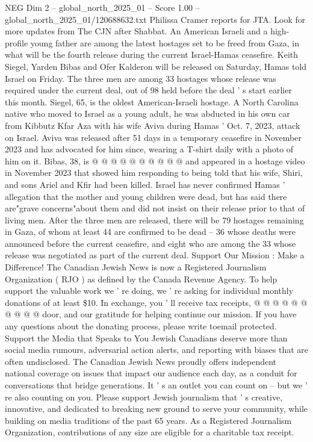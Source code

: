 \begin{textsample}{NEG Dim 2 – global\_north\_2025\_01 – Score 1.00 – global\_north\_2025\_01/120688632.txt}  \label{ex:f2_neg_084}
Philissa Cramer reports for JTA.
Look for more updates from The CJN after Shabbat.
An American Israeli and a high-profile young father are among the latest hostages set to be freed from Gaza, in what will be the fourth release during the current Israel-Hamas ceasefire.
Keith Siegel, Yarden Bibas and Ofer Kalderon will be released on Saturday, Hamas told Israel on Friday.
The three men are among 33 hostages whose release was required under the current deal, out of 98 held before the deal ' s start earlier this month.
Siegel, 65, is the oldest American-Israeli hostage.
A North Carolina native who moved to Israel as a young adult, he was abducted in his own car from Kibbutz Kfar Aza with his wife Aviva during Hamas ' Oct. 7, 2023, attack on Israel.
Aviva was released after 51 days in a temporary ceasefire in November 2023 and has advocated for him since, wearing a T-shirt daily with a photo of him on it.
Bibas, 38, is @ @ @ @ @ @ @ @ @ @ and appeared in a hostage video in November 2023 that showed him responding to being told that his wife, Shiri, and sons Ariel and Kfir had been killed.
Israel has never confirmed Hamas ' allegation that the mother and young children were dead, but has said there are"grave concerns"about them and did not insist on their release prior to that of living men.
After the three men are released, there will be 79 hostages remaining in Gaza, of whom at least 44 are confirmed to be dead -- 36 whose deaths were announced before the current ceasefire, and eight who are among the 33 whose release was negotiated as part of the current deal.
Support Our Mission : Make a Difference!
The Canadian Jewish News is now a Registered Journalism Organization ( RJO ) as defined by the Canada Revenue Agency.
To help support the valuable work we ' re doing, we ' re asking for individual monthly donations of at least \$10.
In exchange, you ' ll receive tax receipts, @ @ @ @ @ @ @ @ @ @ door, and our gratitude for helping continue our mission.
If you have any questions about the donating process, please write toemail protected.
Support the Media that Speaks to You Jewish Canadians deserve more than social media rumours, adversarial action alerts, and reporting with biases that are often undisclosed.
The Canadian Jewish News proudly offers independent national coverage on issues that impact our audience each day, as a conduit for conversations that bridge generations.
It ' s an outlet you can count on -- but we ' re also counting on you.
Please support Jewish journalism that ' s creative, innovative, and dedicated to breaking new ground to serve your community, while building on media traditions of the past 65 years.
As a Registered Journalism Organization, contributions of any size are eligible for a charitable tax receipt.

\end{textsample}
